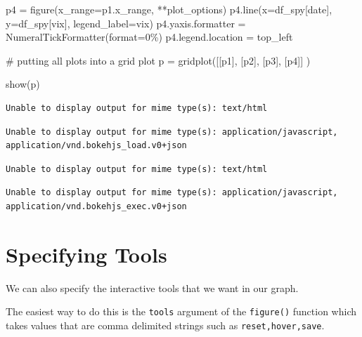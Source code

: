 \documentclass[
  letterpaper,
  DIV=11,
  numbers=noendperiod]{scrreprt}
\newenvironment{Shaded}{\begin{snugshade}}{\end{snugshade}}
\newcommand{\BuiltInTok}[1]{\textcolor[rgb]{0.00,0.23,0.31}{#1}}
\newcommand{\CommentTok}[1]{\textcolor[rgb]{0.37,0.37,0.37}{#1}}
\newcommand{\NormalTok}[1]{\textcolor[rgb]{0.00,0.23,0.31}{#1}}
\newcommand{\OperatorTok}[1]{\textcolor[rgb]{0.37,0.37,0.37}{#1}}
\newcommand{\StringTok}[1]{\textcolor[rgb]{0.13,0.47,0.30}{#1}}
\begin{document}
\begin{Shaded}
\begin{Highlighting}[]
\NormalTok{p4 }\OperatorTok{=}\NormalTok{ figure(x\_range}\OperatorTok{=}\NormalTok{p1.x\_range, }\OperatorTok{**}\NormalTok{plot\_options)}
\NormalTok{p4.line(x}\OperatorTok{=}\NormalTok{df\_spy[}\StringTok{\textquotesingle{}date\textquotesingle{}}\NormalTok{], y}\OperatorTok{=}\NormalTok{df\_spy[}\StringTok{\textquotesingle{}vix\textquotesingle{}}\NormalTok{], legend\_label}\OperatorTok{=}\StringTok{\textquotesingle{}vix\textquotesingle{}}\NormalTok{)}
\NormalTok{p4.yaxis.formatter }\OperatorTok{=}\NormalTok{ NumeralTickFormatter(}\BuiltInTok{format}\OperatorTok{=}\StringTok{\textquotesingle{}0\%\textquotesingle{}}\NormalTok{)}
\NormalTok{p4.legend.location }\OperatorTok{=} \StringTok{\textquotesingle{}top\_left\textquotesingle{}}

\CommentTok{\# putting all plots into a grid plot}
\NormalTok{p }\OperatorTok{=}\NormalTok{ gridplot([[p1], }
\NormalTok{              [p2], }
\NormalTok{              [p3],}
\NormalTok{              [p4]]}
\NormalTok{            )}

\NormalTok{show(p)}
\end{Highlighting}
\end{Shaded}

\begin{verbatim}
Unable to display output for mime type(s): text/html
\end{verbatim}

\begin{verbatim}
Unable to display output for mime type(s): application/javascript, application/vnd.bokehjs_load.v0+json
\end{verbatim}

\begin{verbatim}
Unable to display output for mime type(s): text/html
\end{verbatim}

\begin{verbatim}
Unable to display output for mime type(s): application/javascript, application/vnd.bokehjs_exec.v0+json
\end{verbatim}

\hypertarget{specifying-tools}{%
\section{Specifying Tools}\label{specifying-tools}}

We can also specify the interactive tools that we want in our graph.

The easiest way to do this is the \texttt{tools} argument of the
\texttt{figure()} function which takes values that are comma delimited
strings such as
\texttt{\textquotesingle{}reset,hover,save\textquotesingle{}}.
\end{document}
